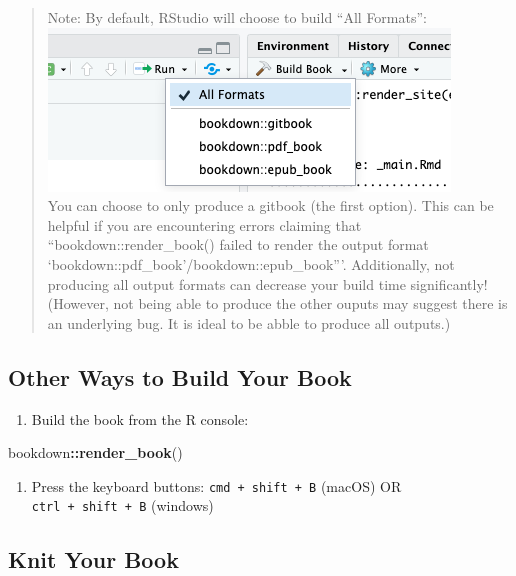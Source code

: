 \documentclass[
]{book}
\newenvironment{Shaded}{\begin{snugshade}}{\end{snugshade}}
\newcommand{\FunctionTok}[1]{\textcolor[rgb]{0.13,0.29,0.53}{\textbf{#1}}}
\newcommand{\NormalTok}[1]{#1}
\newcommand{\SpecialCharTok}[1]{\textcolor[rgb]{0.81,0.36,0.00}{\textbf{#1}}}
\providecommand{\tightlist}{%
  \setlength{\itemsep}{0pt}\setlength{\parskip}{0pt}}
\theoremstyle{definition}
\theoremstyle{definition}
\theoremstyle{definition}
\theoremstyle{definition}
\theoremstyle{remark}
\begin{document}
\begin{quote}
Note: By default, RStudio will choose to build ``All Formats'':
\includegraphics{img/files-and-build/build-book-options.png}\\
You can choose to only produce a gitbook (the first option). This can be helpful if you are encountering errors claiming that ``bookdown::render\_book() failed to render the output format `bookdown::pdf\_book'/bookdown::epub\_book'''. Additionally, not producing all output formats can decrease your build time significantly! (However, not being able to produce the other ouputs may suggest there is an underlying bug. It is ideal to be abble to produce all outputs.)
\end{quote}

\subsection{Other Ways to Build Your Book}\label{other-ways-to-build-your-book}

\begin{enumerate}
\def\labelenumi{\arabic{enumi}.}
\tightlist
\item
  Build the book from the R console:
\end{enumerate}

\begin{Shaded}
\begin{Highlighting}[]
\NormalTok{bookdown}\SpecialCharTok{::}\FunctionTok{render\_book}\NormalTok{()}
\end{Highlighting}
\end{Shaded}

\begin{enumerate}
\def\labelenumi{\arabic{enumi}.}
\setcounter{enumi}{1}
\tightlist
\item
  Press the keyboard buttons: \texttt{cmd\ +\ shift\ +\ B} (macOS) OR \texttt{ctrl\ +\ shift\ +\ B} (windows)
\end{enumerate}

\subsection{Knit Your Book}\label{knit-your-book}
\end{document}
